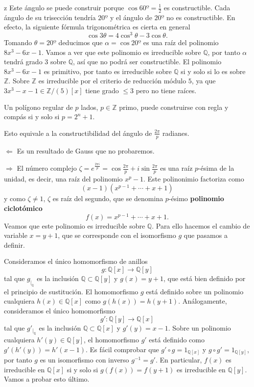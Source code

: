  z Este ángulo se puede construir porque
\(\cos 60º=\frac{1}{2}\) es constructible. Cada ángulo de su trisección
tendría \(20º\) y el ángulo de \(20º\) no es constructible. En efecto,
la siguiente fórmula trigonométrica es cierta en general
\[\cos 3\theta=4\cos^3\theta-3\cos\theta.\] Tomando \(\theta= 20º\)
deducimos que \(\alpha=\cos 20º\) es una raíz del polinomio
\(8x^3-6x-1\). Vamos a ver que este polinomio es irreducible sobre
\(\mathbb Q\), por tanto \(\alpha\) tendrá grado \(3\) sobre
\(\mathbb Q\), así que no podrá ser constructible. El polinomio
\(8x^3-6x-1\) es primitivo, por tanto es irreducible sobre \(\mathbb Q\)
si y solo si lo es sobre \(\mathbb Z\). Sobre \(\mathbb Z\) es
irreducible por el criterio de reducción módulo \(5\), ya que
\(3x^3-x-1\in\mathbb Z/(5)[x]\) tiene grado \(\leq 3\) pero no tiene
raíces. 


Un polígono regular de \(p\) lados, \(p\in\mathbb Z\) primo, puede
construirse con regla y compás si y solo si \(p=2^n+1\).


Esto equivale a la constructibilidad del ángulo de \(\frac{2\pi}{p}\)
radianes.

\(\Leftarrow\) Es un resultado de Gauss que no probaremos.

\(\Rightarrow\) El número complejo
\(\zeta=e^{\frac{2\pi i}{p}}=\cos\frac{2\pi}{p}+i\sin \frac{2\pi}{p}\)
es una raíz \(p\)-ésima de la unidad, es decir, una raíz del polinomio
\(x^p-1\). Este polinonimio factoriza como \[(x-1)(x^{p-1}+\cdots+x+1)\]
y como \(\zeta\neq 1\), \(\zeta\) es raíz del segundo, que se denomina
\(p\)-ésimo \textbf{polinomio ciclotómico} \[f(x)=x^{p-1}+\cdots+x+1.\]
Veamos que este polinomio es irreducible sobre \(\mathbb Q\). Para ello
hacemos el cambio de variable \(x=y+1\), que se corresponde con el
isomorfismo \(g\) que pasamos a definir.

Consideramos el único homomorfismo de anillos
\[g\colon \mathbb Q[x]\longrightarrow \mathbb Q[y]\] tal que
\(g_{|_{\mathbb{Q}}}\) es la inclusión
\(\mathbb{Q}\subset\mathbb{Q}[y]\) y \(g(x)=y+1\), que está bien
definido por el principio de sustitución. El homomorfismo \(g\) está
definido sobre un polinomio cualquiera \(h(x)\in\mathbb{Q}[x]\) como
\(g(h(x))=h(y+1)\). Análogamente, consideramos el único homomorfismo
\[g'\colon \mathbb Q[y]\longrightarrow \mathbb Q[x]\] tal que
\(g'_{|_{\mathbb{Q}}}\) es la inclusión
\(\mathbb{Q}\subset\mathbb{Q}[x]\) y \(g'(y)=x-1\). Sobre un polinomio
cualquiera \(h'(y)\in\mathbb{Q}[y]\), el homomorfismo \(g'\) está
definido como \(g'(h'(y))=h'(x-1)\). Es fácil comprobar que
\(g'\circ g=1_{\mathbb{Q}[x]}\) y \(g\circ g'=1_{\mathbb{Q}[y]}\), por
tanto \(g\) es un isomorfismo con inverso \(g^{-1}=g'\). En particular,
\(f(x)\) es irreducible en \(\mathbb{Q}[x]\) si y solo si
\(g(f(x))=f(y+1)\) es irreducible en \(\mathbb{Q}[y]\). Vamos a probar
esto último.

